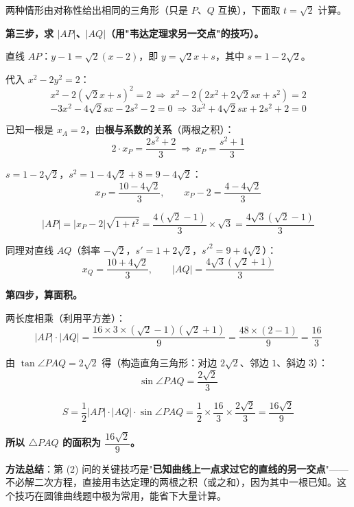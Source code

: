 \begin{answer}
两种情形由对称性给出相同的三角形（只是 $P$、$Q$ 互换），下面取 $t=\sqrt2$ 计算。

\textbf{第三步，求 $|AP|$、$|AQ|$（用"韦达定理求另一交点"的技巧）。}

直线 $AP$：$y-1=\sqrt2(x-2)$，即 $y=\sqrt2x+s$，其中 $s=1-2\sqrt2$。

代入 $x^{2}-2y^{2}=2$：
\nopagebreak[4]
\[x^{2}-2\left(\sqrt2x+s\right)^{2}=2\ \Longrightarrow\ x^{2}-2\left(2x^{2}+2\sqrt2sx+s^{2}\right)=2\]
\nopagebreak[4]
\[-3x^{2}-4\sqrt2sx-2s^{2}-2=0\ \Longrightarrow\ 3x^{2}+4\sqrt2sx+2s^{2}+2=0\]

已知一根是 $x_A=2$，由\textbf{根与系数的关系}（两根之积）：
\nopagebreak[4]
\[2\cdot x_P=\frac{2s^{2}+2}3\ \Longrightarrow\ x_P=\frac{s^{2}+1}3\]

$s=1-2\sqrt2$，$s^{2}=1-4\sqrt2+8=9-4\sqrt2$：
\nopagebreak[4]
\[x_P=\frac{10-4\sqrt2}3,\qquad x_P-2=\frac{4-4\sqrt2}3\]

\nopagebreak[4]
\[|AP|=\left|x_P-2\right|\sqrt{1+t^{2}}=\frac{4\left(\sqrt2-1\right)}3\times\sqrt3=\frac{4\sqrt3\left(\sqrt2-1\right)}3\]

同理对直线 $AQ$（斜率 $-\sqrt2$，$s'=1+2\sqrt2$，$s'^{2}=9+4\sqrt2$）：
\nopagebreak[4]
\[x_Q=\frac{10+4\sqrt2}3,\qquad |AQ|=\frac{4\sqrt3\left(\sqrt2+1\right)}3\]

\textbf{第四步，算面积。}

两长度相乘（利用平方差）：
\nopagebreak[4]
\[|AP|\cdot|AQ|=\frac{16\times3\times\left(\sqrt2-1\right)\left(\sqrt2+1\right)}9=\frac{48\times(2-1)}9=\frac{16}3\]

由 $\tan\angle PAQ=2\sqrt2$ 得（构造直角三角形：对边 $2\sqrt2$、邻边 $1$、斜边 $3$）：
\nopagebreak[4]
\[\sin\angle PAQ=\frac{2\sqrt2}3\]

\nopagebreak[4]
\[S=\frac12|AP|\cdot|AQ|\cdot\sin\angle PAQ=\frac12\times\frac{16}3\times\frac{2\sqrt2}3=\frac{16\sqrt2}9\]

\textbf{所以 $\triangle PAQ$ 的面积为 $\dfrac{16\sqrt2}9$。}

\begin{gktip}
\textbf{方法总结}：第 (2) 问的关键技巧是"\textbf{已知曲线上一点求过它的直线的另一交点}"——不必解二次方程，直接用韦达定理的两根之积（或之和），因为其中一根已知。这个技巧在圆锥曲线题中极为常用，能省下大量计算。
\end{gktip}



\par\medskip

\end{answer}
